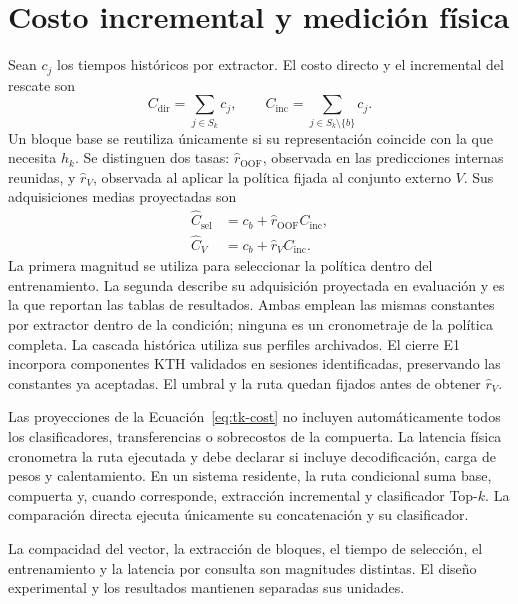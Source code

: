 \section{Costo incremental y medición física}
Sean \(c_j\) los tiempos históricos por extractor. El costo directo y el incremental del rescate son
\begin{equation}
C_{\mathrm{dir}}=\sum_{j\in S_k}c_j,\qquad
C_{\mathrm{inc}}=\sum_{j\in S_k\setminus\{b\}}c_j.
\label{eq:tk-incremental}
\end{equation}
Un bloque base se reutiliza únicamente si su representación coincide con la que necesita \(h_k\). Se distinguen dos tasas: \(\widehat r_{\mathrm{OOF}}\), observada en las predicciones internas reunidas, y \(\widehat r_V\), observada al aplicar la política fijada al conjunto externo \(V\). Sus adquisiciones medias proyectadas son
\begin{equation}
\begin{aligned}
\widehat C_{\mathrm{sel}} &= c_b+\widehat r_{\mathrm{OOF}}C_{\mathrm{inc}},\\
\widehat C_V &= c_b+\widehat r_VC_{\mathrm{inc}}.
\end{aligned}
\label{eq:tk-cost}
\end{equation}
La primera magnitud se utiliza para seleccionar la política dentro del entrenamiento. La segunda describe su adquisición proyectada en evaluación y es la que reportan las tablas de resultados. Ambas emplean las mismas constantes por extractor dentro de la condición; ninguna es un cronometraje de la política completa. La cascada histórica utiliza sus perfiles archivados. El cierre E1 incorpora componentes KTH validados en sesiones identificadas, preservando las constantes ya aceptadas. El umbral y la ruta quedan fijados antes de obtener \(\widehat r_V\).

Las proyecciones de la Ecuación~\ref{eq:tk-cost} no incluyen automáticamente todos los clasificadores, transferencias o sobrecostos de la compuerta. La latencia física cronometra la ruta ejecutada y debe declarar si incluye decodificación, carga de pesos y calentamiento. En un sistema residente, la ruta condicional suma base, compuerta y, cuando corresponde, extracción incremental y clasificador Top-\(k\). La comparación directa ejecuta únicamente su concatenación y su clasificador.

La compacidad del vector, la extracción de bloques, el tiempo de selección, el entrenamiento y la latencia por consulta son magnitudes distintas. El diseño experimental y los resultados mantienen separadas sus unidades.
